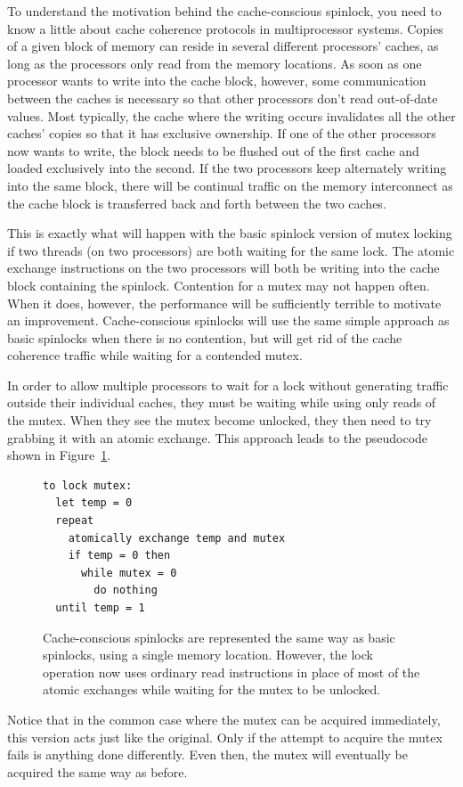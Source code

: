 To understand the motivation behind the cache-conscious spinlock, you need to
know a little about cache coherence
protocols in multiprocessor
systems.  Copies of a given block of memory can reside in several
different processors' caches, as long as the processors only read from the
memory locations.  As soon as one processor wants to write into the
cache block, however, some communication between the caches is
necessary so that other processors don't read out-of-date
values.  Most typically, the cache where the writing occurs invalidates all the other caches' copies so
that it has exclusive ownership.  If one of the other processors now
wants to write, the block needs to be flushed out of the first cache
and loaded exclusively into the second.  If the two processors keep
alternately writing into the same block, there will be continual
traffic on the memory interconnect as the cache block is transferred
back and forth between the two caches.

This is exactly what will happen with the basic spinlock version of mutex
locking if two threads (on two processors) are both waiting for the
same lock.  The atomic exchange instructions on the two processors will
both be writing into the cache block containing the spinlock.
Contention for a mutex may not
happen often.  When it does, however, the performance will be
sufficiently terrible to motivate an improvement. Cache-conscious spinlocks
will use the same simple approach as basic spinlocks  when there is no
contention, but will get rid of the cache coherence traffic while waiting
for a contended mutex.

In order to allow multiple processors to wait for a lock without
generating traffic outside their individual caches, they must be
waiting while using only reads of the mutex.  When they see the mutex become
unlocked, they then need to try grabbing it with an atomic
exchange.  This approach leads to the pseudocode shown in Figure~\ref{cache-conscious-lock}.
\begin{figure}
\begin{verbatim}
to lock mutex:
  let temp = 0
  repeat
    atomically exchange temp and mutex
    if temp = 0 then
      while mutex = 0
        do nothing
  until temp = 1
\end{verbatim}
\caption{Cache-conscious spinlocks are represented the same way as
  basic spinlocks, using a single memory location.  However, the lock
  operation now uses ordinary read instructions in place of most of
  the atomic exchanges while waiting for the mutex to be unlocked.}
\label{cache-conscious-lock}
\end{figure}
Notice that in the common case where the mutex can be acquired
immediately, this version acts just like the original.  Only if the
attempt to acquire the mutex fails is anything done differently.  Even
then, the mutex will eventually be acquired the same way as before.

